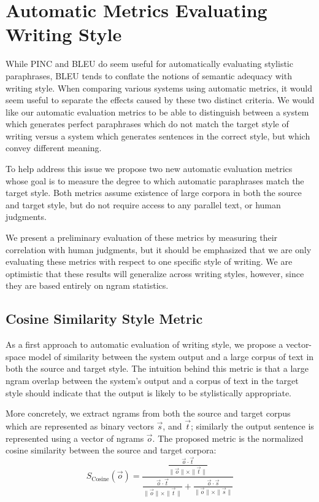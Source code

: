 \documentclass[10pt,a5paper,twoside]{article}
\begin{document}
\section{Automatic Metrics Evaluating Writing Style}
While PINC and BLEU do seem useful for automatically evaluating stylistic paraphrases, BLEU tends to conflate the notions of
semantic adequacy with writing style.  When comparing various systems using automatic metrics, it would seem useful
to separate the effects caused by these two distinct criteria.  We would like our automatic evaluation metrics to be able to distinguish
between a system which generates perfect paraphrases which do not match the target style of writing versus a system which
generates sentences in the correct style, but which convey different meaning.

To help address this issue we propose two new automatic evaluation metrics whose goal is to measure the degree to which
automatic paraphrases match the target style.  Both metrics assume existence of large corpora in both the source and
target style, but do not require access to any parallel text, or human judgments.

We present a preliminary evaluation of these metrics by measuring their correlation with human judgments, but
it should be emphasized that we are only evaluating these metrics with respect to one specific style of writing.  We
are optimistic that these results will generalize across writing styles, however, since they are based entirely
on ngram statistics.

\subsection{Cosine Similarity Style Metric}
As a first approach to automatic evaluation of writing style, we propose a vector-space model of similarity between the system
output and a large corpus of text in both the source and target style.  The intuition behind this metric is that  a large ngram
overlap between the system's output and a corpus of text in the target style should indicate that the
output is likely to be stylistically appropriate.

More concretely, we extract ngrams from both the source and target corpus which are represented as binary
vectors $\vec{s}$, and $\vec{t}$; similarly the output sentence is represented using a vector of
ngrams $\vec{o}$.  
The proposed metric is the normalized cosine similarity between the source and target corpora:
\[
S_{\text{Cosine}}(\vec{o}) = \frac{\frac{\vec{o} \cdot \vec{t}}{\|\vec{o}\| \times \|\vec{t}\|}}{\frac{\vec{o} \cdot \vec{t}}{\|\vec{o}\| \times \|\vec{t}\|} + \frac{\vec{o} \cdot \vec{s}}{\|\vec{o}\| \times \|\vec{s}\|}}
\]
\end{document}
